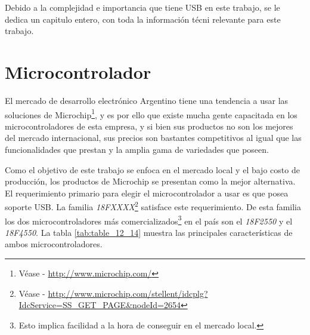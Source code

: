 Debido a la complejidad e importancia que tiene USB en este trabajo, se le
dedica un capitulo entero, con toda la informaci\'on t\'ecni
relevante para este trabajo.


\section{Microcontrolador} %
El mercado de desarrollo electr\'onico Argentino tiene una tendencia a usar las
soluciones de Microchip\footnote{V\'ease - \url{http://www.microchip.com/}}, y
es por ello que existe mucha gente capacitada en los microcontroladores de esta
empresa, y si bien sus productos no son los mejores del mercado internacional,
sus precios son bastantes competitivos al igual que las funcionalidades que
prestan y la amplia gama de variedades que poseen.\

Como el objetivo de este trabajo se enfoca en el mercado local y el bajo costo
de producci\'on, los productos de Microchip se presentan como la mejor
alternativa.\\

El requerimiento primario para elegir el microcontrolador a usar es que posea
soporte USB. La familia \emph{18FXXXX}\footnote{V\'ease - \url{
http://www.microchip.com/stellent/idcplg?IdcService=SS_GET_PAGE&nodeId=2654}}
satisface este requerimiento. De esta familia los dos microcontroladores m\'as
comercializados\footnote{Esto implica facilidad a la hora de conseguir en el
mercado local.} en el pa\'is son el \emph{18F2550} y el \emph{18F4550}. La
tabla \ref{tab:table_12_14} muestra las principales caracter\'isticas de ambos
microcontroladores.

